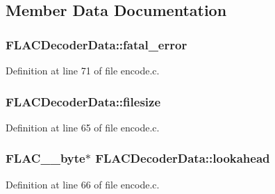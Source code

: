 \subsection{Member Data Documentation}
\subsubsection[{\texorpdfstring{fatal\+\_\+error}{fatal_error}}]{ F\+L\+A\+C\+Decoder\+Data\+::fatal\+\_\+error}\hypertarget{struct_f_l_a_c_decoder_data_a8384d17adcd60b057cbb6ac3486de0e8}{}\label{struct_f_l_a_c_decoder_data_a8384d17adcd60b057cbb6ac3486de0e8}


Definition at line 71 of file encode.\+c.

\subsubsection[{\texorpdfstring{filesize}{filesize}}]{ F\+L\+A\+C\+Decoder\+Data\+::filesize}\hypertarget{struct_f_l_a_c_decoder_data_a7e94980f163509fe82cb538d412ecd7e}{}\label{struct_f_l_a_c_decoder_data_a7e94980f163509fe82cb538d412ecd7e}


Definition at line 65 of file encode.\+c.

\subsubsection[{\texorpdfstring{lookahead}{lookahead}}]{ {\bf F\+L\+A\+C\+\_\+\+\_\+byte}$\ast$ F\+L\+A\+C\+Decoder\+Data\+::lookahead}\hypertarget{struct_f_l_a_c_decoder_data_a767c99e80e1d1316ffa8a097e4b1adf6}{}\label{struct_f_l_a_c_decoder_data_a767c99e80e1d1316ffa8a097e4b1adf6}


Definition at line 66 of file encode.\+c.

